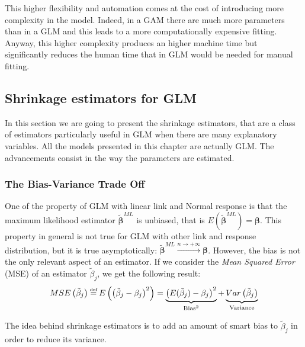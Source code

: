 \documentclass[a4paper, nobind]{templates/ociamthesis}
\newcommand\eqdef{\mathrel{\overset{\makebox[0pt]{\mbox{\normalfont\tiny def}}}{=}}}
\theoremstyle{definition}
\theoremstyle{definition}
\theoremstyle{definition}
\theoremstyle{remark}
\begin{document}
This higher flexibility and automation comes at the cost of introducing more complexity in the model. Indeed, in a GAM there are much more parameters than in a GLM and this leads to a more computationally expensive fitting. Anyway, this higher complexity produces an higher machine time but significantly reduces the human time that in GLM would be needed for manual fitting.

\newpage

\hypertarget{shrinkage-estimators-for-glm}{%
\subsection{Shrinkage estimators for GLM}\label{shrinkage-estimators-for-glm}}

In this section we are going to present the shrinkage estimators, that are a class of estimators particularly useful in GLM when there are many explanatory variables. All the models presented in this chapter are actually GLM. The advancements consist in the way the parameters are estimated.

\hypertarget{the-bias-variance-trade-off}{%
\subsubsection{The Bias-Variance Trade Off}\label{the-bias-variance-trade-off}}

One of the property of GLM with linear link and Normal response is that the maximum likelihood estimator \(\boldsymbol{\tilde{\beta}}^{ML}\) is unbiased, that is \(E\left(\boldsymbol{\tilde{\beta}}^{ML}\right) = \boldsymbol{\beta}\). This property in general is not true for GLM with other link and response distribution, but it is true asymptotically: \(\boldsymbol{\tilde{\beta}}^{ML} \xrightarrow{n\to+\infty} \boldsymbol{\beta}\). However, the bias is not the only relevant aspect of an estimator. If we consider the \emph{Mean Squared Error} (MSE) of an estimator \(\tilde{\beta}_j\), we get the following result:
\begin{equation}
\label{eq:bias-variance}
MSE\left(\tilde{\beta}_j\right) \eqdef E\left(\left(\tilde{\beta}_j - \beta_j\right)^2\right) =
\underbrace{\left( E(\tilde{\beta}_j)-\beta_j \right)^2}_{\text{Bias}^2} + 
\underbrace{Var\left( \tilde{\beta}_j \right)}_{\text{Variance}}
\end{equation}

The idea behind shrinkage estimators is to add an amount of smart bias to \(\tilde{\beta}_j\) in order to reduce its variance.
\end{document}
